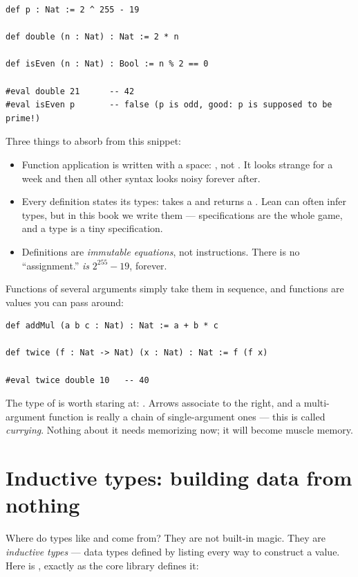\begin{lstlisting}[language=Lean]
def p : Nat := 2 ^ 255 - 19

def double (n : Nat) : Nat := 2 * n

def isEven (n : Nat) : Bool := n % 2 == 0

#eval double 21      -- 42
#eval isEven p       -- false (p is odd, good: p is supposed to be prime!)
\end{lstlisting}

Three things to absorb from this snippet:

\begin{itemize}[leftmargin=1.4em]
\item Function application is written with a space: , not
  . It looks strange for a week and then all other syntax
  looks noisy forever after.
\item Every definition states its types:  takes a  and
  returns a . Lean can often infer types, but in this book we write
  them --- specifications are the whole game, and a type is a tiny
  specification.
\item Definitions are \emph{immutable equations}, not instructions. There is
  no ``assignment.''  \emph{is} $2^{255}-19$, forever.
\end{itemize}

Functions of several arguments simply take them in sequence, and functions
are values you can pass around:

\begin{lstlisting}[language=Lean]
def addMul (a b c : Nat) : Nat := a + b * c

def twice (f : Nat -> Nat) (x : Nat) : Nat := f (f x)

#eval twice double 10   -- 40
\end{lstlisting}

The type of  is worth staring at:
. Arrows associate to the right, and a
multi-argument function is really a chain of single-argument ones --- this is
called \emph{currying}. Nothing about it needs memorizing now; it will become
muscle memory.

\section{Inductive types: building data from nothing}

Where do types like  and  come from? They are not
built-in magic. They are \emph{inductive types} --- data types defined by
listing every way to construct a value. Here is , exactly as the
core library defines it:

